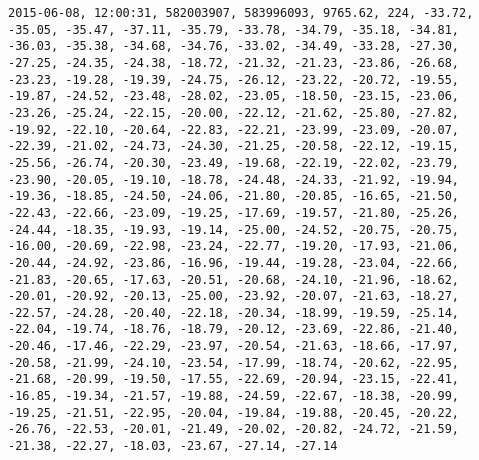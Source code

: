 \begin{lstlisting}
2015-06-08, 12:00:31, 582003907, 583996093, 9765.62, 224, -33.72, -35.05, -35.47, -37.11, -35.79, -33.78, -34.79, -35.18, -34.81, -36.03, -35.38, -34.68, -34.76, -33.02, -34.49, -33.28, -27.30, -27.25, -24.35, -24.38, -18.72, -21.32, -21.23, -23.86, -26.68, -23.23, -19.28, -19.39, -24.75, -26.12, -23.22, -20.72, -19.55, -19.87, -24.52, -23.48, -28.02, -23.05, -18.50, -23.15, -23.06, -23.26, -25.24, -22.15, -20.00, -22.12, -21.62, -25.80, -27.82, -19.92, -22.10, -20.64, -22.83, -22.21, -23.99, -23.09, -20.07, -22.39, -21.02, -24.73, -24.30, -21.25, -20.58, -22.12, -19.15, -25.56, -26.74, -20.30, -23.49, -19.68, -22.19, -22.02, -23.79, -23.90, -20.05, -19.10, -18.78, -24.48, -24.33, -21.92, -19.94, -19.36, -18.85, -24.50, -24.06, -21.80, -20.85, -16.65, -21.50, -22.43, -22.66, -23.09, -19.25, -17.69, -19.57, -21.80, -25.26, -24.44, -18.35, -19.93, -19.14, -25.00, -24.52, -20.75, -20.75, -16.00, -20.69, -22.98, -23.24, -22.77, -19.20, -17.93, -21.06, -20.44, -24.92, -23.86, -16.96, -19.44, -19.28, -23.04, -22.66, -21.83, -20.65, -17.63, -20.51, -20.68, -24.10, -21.96, -18.62, -20.01, -20.92, -20.13, -25.00, -23.92, -20.07, -21.63, -18.27, -22.57, -24.28, -20.40, -22.18, -20.34, -18.99, -19.59, -25.14, -22.04, -19.74, -18.76, -18.79, -20.12, -23.69, -22.86, -21.40, -20.46, -17.46, -22.29, -23.97, -20.54, -21.63, -18.66, -17.97, -20.58, -21.99, -24.10, -23.54, -17.99, -18.74, -20.62, -22.95, -21.68, -20.99, -19.50, -17.55, -22.69, -20.94, -23.15, -22.41, -16.85, -19.34, -21.57, -19.88, -24.59, -22.67, -18.38, -20.99, -19.25, -21.51, -22.95, -20.04, -19.84, -19.88, -20.45, -20.22, -26.76, -22.53, -20.01, -21.49, -20.02, -20.82, -24.72, -21.59, -21.38, -22.27, -18.03, -23.67, -27.14, -27.14

\end{lstlisting}
